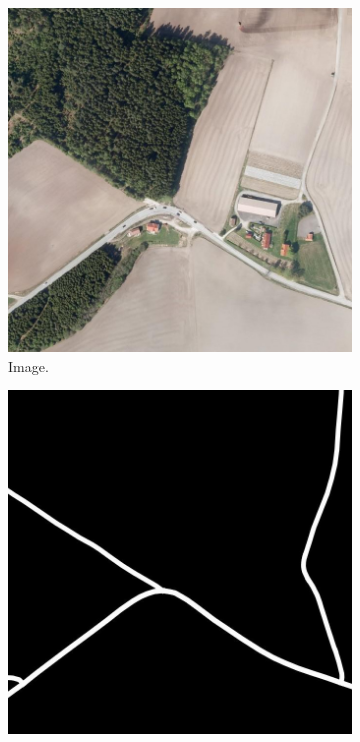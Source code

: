\begin{figure}[H]
\begin{subfigure}{0.23\textwidth}
\includegraphics[width=\textwidth]{figs/appendix/img1151.jpg}
\caption{ Image. }
\vspace{0.1cm} %
\end{subfigure}
\hspace*{\fill} %
\begin{subfigure}{0.23\textwidth}
\includegraphics[width=\textwidth]{figs/appendix/label1151.jpg}

\end{subfigure}
\end{figure}
